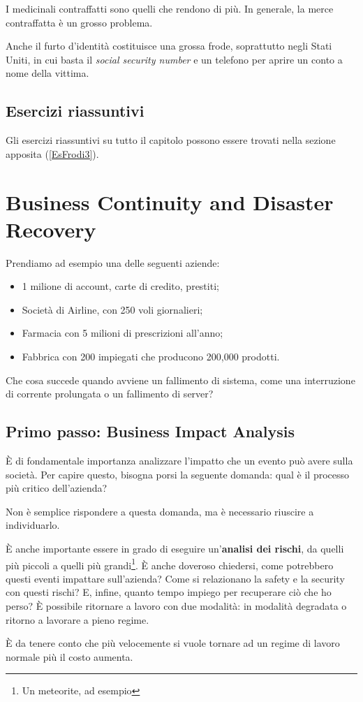 I medicinali contraffatti sono quelli che rendono di più. In generale, la merce
contraffatta è un grosso problema.

Anche il furto d'identità costituisce una grossa frode, soprattutto negli
Stati Uniti, in cui basta il \emph{social security number} e un telefono per aprire un conto
a nome della vittima.

\section{Esercizi riassuntivi}

Gli esercizi riassuntivi su tutto il capitolo possono essere trovati nella
sezione apposita (\ref{EsFrodi3}).

\chapter{Business Continuity and Disaster Recovery}
\label{BCDR}

Prendiamo ad esempio una delle seguenti aziende:
\begin{itemize}
  \item 1 milione di account, carte di credito, prestiti;
  \item Società di Airline, con 250 voli giornalieri;
  \item Farmacia con 5 milioni di prescrizioni all'anno;
  \item Fabbrica con 200 impiegati che producono 200,000 prodotti.
\end{itemize}

Che cosa succede quando avviene un fallimento di sistema, come una interruzione
di corrente prolungata o un fallimento di server?

\section{Primo passo: Business Impact Analysis}

È di fondamentale importanza analizzare l'impatto che un evento può avere sulla
società. Per capire questo, bisogna porsi la seguente domanda: qual è il
processo più critico dell'azienda?

Non è semplice rispondere a questa domanda, ma è necessario riuscire a
individuarlo.

È anche importante essere in grado di eseguire un'\textbf{analisi dei rischi},
da quelli più piccoli a quelli più grandi\footnote{Un meteorite, ad esempio}. È
anche doveroso chiedersi, come potrebbero questi eventi impattare sull'azienda?
Come si relazionano la safety e la security con questi rischi? E, infine,
quanto tempo impiego per recuperare ciò che ho perso? È possibile ritornare a
lavoro con due modalità: in modalità degradata o ritorno a lavorare a pieno 
regime.

È da tenere conto che più velocemente si vuole tornare ad un regime di lavoro
normale più il costo aumenta.
